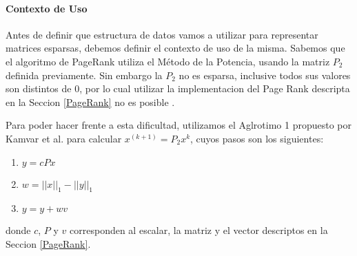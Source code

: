 \paragraph{Contexto de Uso}

Antes de definir que estructura de datos vamos a utilizar para representar matrices esparsas, debemos definir el contexto de uso de la misma.
Sabemos que el algoritmo de PageRank utiliza el Método de la Potencia, usando la matriz $P_2$ definida previamente. Sin embargo la $P_2$ no es esparsa, inclusive todos sus valores son distintos de 0, por lo cual utilizar la implementacion del Page Rank descripta en la Seccion \ref{PageRank} no es posible .

Para poder hacer frente a esta dificultad, utilizamos el Aglrotimo 1 propuesto por Kamvar et al.\cite{Kamvar2003} para calcular $x^{(k+1)} = P_2x^{k}$, cuyos pasos son los siguientes:
\begin{enumerate}
    \item $y = cPx$
    \item $w = ||x||_1 - ||y||_1$
    \item $y = y + wv$
\end{enumerate}

donde $c$, $P$ y $v$ corresponden al escalar, la matriz y el vector descriptos en la Seccion \ref{PageRank}.

